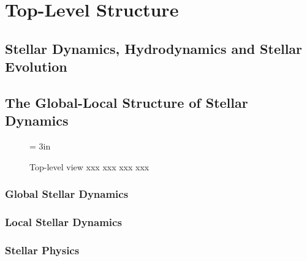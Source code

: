 \documentclass{article}[12pt]
\def\filler{xxxx xxxx xxxx xxxx xxxx xxxx xxxx xxxx xxxx xxxx xxxx xxxx
xxxx xxxx xxxx xxxx xxxx xxxx xxxx xxxx xxxx xxxx xxxx xxxx
xxxx xxxx xxxx xxxx xxxx xxxx xxxx xxxx xxxx xxxx xxxx xxxx
xxxx xxxx xxxx xxxx xxxx xxxx xxxx xxxx xxxx xxxx xxxx xxxx
xxxx xxxx xxxx xxxx xxxx xxxx xxxx xxxx xxxx xxxx xxxx xxxx
xxxx xxxx xxxx xxxx xxxx xxxx xxxx xxxx xxxx xxxx xxxx xxxx
xxxx xxxx xxxx xxxx xxxx xxxx xxxx xxxx xxxx xxxx xxxx xxxx
xxxx xxxx xxxx xxxx xxxx xxxx xxxx xxxx xxxx xxxx xxxx xxxx}
\def\filler{}
\begin{document}
\filler

\clearpage
\newpage

\section{Top-Level Structure}

\filler

\subsection{Stellar Dynamics, Hydrodynamics and Stellar Evolution}

\filler

\subsection{The Global-Local Structure of Stellar Dynamics}

\begin{figure}[htb]
\begin{center}
\epsfxsize = 3in
\caption
{Top-level view xxx xxx xxx xxx}
\label{fig:top1}
\end{center}
\end{figure}


\filler

\subsubsection{Global Stellar Dynamics}

\filler

\subsubsection{Local Stellar Dynamics}

\filler

\subsubsection{Stellar Physics}

\filler
\end{document}
